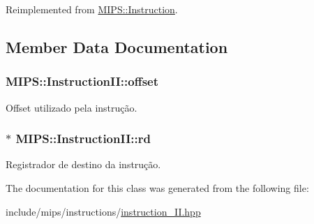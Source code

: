 Reimplemented from \hyperlink{classMIPS_1_1Instruction_a7df847adef2997446ffca9b71c2f3112}{M\+I\+P\+S\+::\+Instruction}.



\subsection{Member Data Documentation}
\subsubsection[{\texorpdfstring{offset}{offset}}]{ M\+I\+P\+S\+::\+Instruction\+I\+I\+::offset\hspace{0.3cm}{\ttfamily [protected]}}\hypertarget{classMIPS_1_1InstructionII_ae34cdcf18cd37944dfecb96d5b07b5cb}{}\label{classMIPS_1_1InstructionII_ae34cdcf18cd37944dfecb96d5b07b5cb}
Offset utilizado pela instrução. 
\subsubsection[{\texorpdfstring{rd}{rd}}]{$\ast$ M\+I\+P\+S\+::\+Instruction\+I\+I\+::rd\hspace{0.3cm}{\ttfamily [protected]}}\hypertarget{classMIPS_1_1InstructionII_a2a709b8170f2bf653de2102df9403e1f}{}\label{classMIPS_1_1InstructionII_a2a709b8170f2bf653de2102df9403e1f}
Registrador de destino da instrução. 

The documentation for this class was generated from the following file\+:\begin{DoxyCompactItemize}
\item 
include/mips/instructions/\hyperlink{instruction__II_8hpp}{instruction\+\_\+\+I\+I.\+hpp}\end{DoxyCompactItemize}
